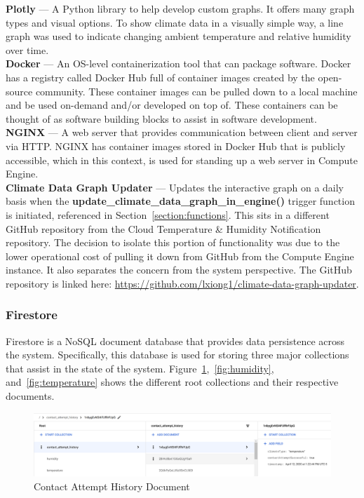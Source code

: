 \documentclass{article}
\begin{document}
\textbf{Plotly} — A Python library to help develop custom graphs. It offers many graph types and visual options. To show climate data in a visually simple way, a line graph was used to indicate changing ambient temperature and relative humidity over time.\\

\textbf{Docker} — An OS-level containerization tool that can package software. Docker has a registry called Docker Hub full of container images created by the open-source community. These container images can be pulled down to a local machine and be used on-demand and/or developed on top of. These containers can be thought of as software building blocks to assist in software development.\\

\textbf{NGINX} — A web server that provides communication between client and server via HTTP. NGINX has container images stored in Docker Hub that is publicly accessible, which in this context, is used for standing up a web server in Compute Engine.\\

\textbf{Climate Data Graph Updater} — Updates the interactive graph on a daily basis when the \textbf{update\_climate\_data\_graph\_in\_engine()} trigger function is initiated, referenced in Section~\ref{section:functions}. This sits in a different GitHub repository from the Cloud Temperature \& Humidity Notification repository. The decision to isolate this portion of functionality was due to the lower operational cost of pulling it down from GitHub from the Compute Engine instance. It also separates the concern from the system perspective. The GitHub repository is linked here: \url{https://github.com/lxiong1/climate-data-graph-updater}.

\subsubsection{Firestore}
Firestore is a NoSQL document database that provides data persistence across the system. Specifically, this database is used for storing three major collections that assist in the state of the system. Figure~\ref{fig:contact-attempt-history},~\ref{fig:humidity}, and~\ref{fig:temperature} shows the different root collections and their respective documents.

\begin{figure}[H]
	\center
	\includegraphics[width=\textwidth]{images/database-contact-attempt-history.png}
	\caption{Contact Attempt History Document}
	\label{fig:contact-attempt-history}
\end{figure}
\end{document}
